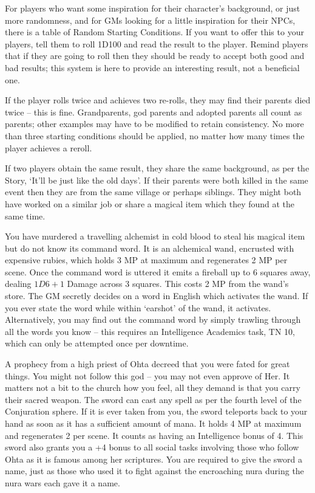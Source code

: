 \begin{multicols}{2}

\noindent
For players who want some inspiration for their character's background, or just more randomness, and for GMs looking for a little inspiration for their NPCs, there is a table of Random Starting Conditions.  If you want to offer this to your players, tell them to roll 1D100 and read the result to the player.  Remind players that if they are going to roll then they should be ready to accept both good and bad results; this system is here to provide an interesting result, not a beneficial one.

If the player rolls twice and achieves two re-rolls, they may find their parents died twice -- this is fine.
Grandparents, god parents and adopted parents all count as parents; other examples may have to be modified to retain consistency.
No more than three starting conditions should be applied, no matter how many times the player achieves a reroll.

	If two players obtain the same result, they share the same background, as per the Story, `It'll be just like the old days'.  If their parents were both killed in the same event then they are from the same village or perhaps siblings.  They might both have worked on a similar job or share a magical item which they found at the same time.

\setcounter{list}{0}
\begin{list}{\addtocounter{list}{1}\textbf{:}}{\raggedleft}

	\item{ You have murdered a travelling alchemist in cold blood to steal his magical item but do not know its command word.  It is an alchemical wand, encrusted with expensive rubies, which holds 3 MP at maximum and regenerates 2 MP per scene.  Once the command word is uttered it emits a fireball up to 6 squares away, dealing $1D6+1$ Damage across 3 squares.   This costs 2 MP from the wand's store.  The GM secretly decides on a word in English which activates the wand.  If you ever state the word while within `earshot' of the wand, it activates.  Alternatively, you may find out the command word by simply trawling through all the words you know -- this requires an Intelligence  Academics task, TN 10, which can only be attempted once per downtime. }

	\item{ A prophecy from a high priest of Ohta decreed that you were fated for great things.  You might not follow this god -- you may not even approve of Her.  It matters not a bit to the church how you feel, all they demand is that you carry their sacred weapon.  The sword can cast any spell as per the fourth level of the Conjuration sphere.  If it is ever taken from you, the sword teleports back to your hand as soon as it has a sufficient amount of mana.  It holds 4 MP at maximum and regenerates 2 per scene.  It counts as having an Intelligence bonus of 4.  This sword also grants you a +4 bonus to all social tasks involving those who follow Ohta as it is famous among her scriptures.  You are required to give the sword a name, just as those who used it to fight against the encroaching nura during the nura wars each gave it a name.}


\end{list}
\end{multicols}
